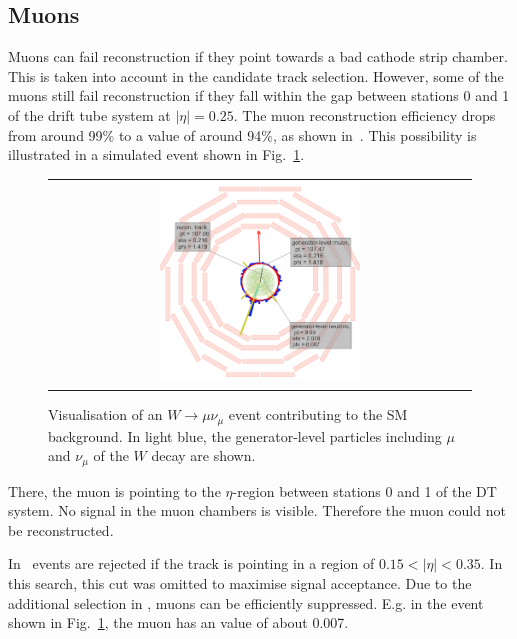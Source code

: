 \subsection*{Muons}
Muons can fail reconstruction if they point towards a bad cathode strip chamber.
This is taken into account in the candidate track selection.
However, some of the muons still fail reconstruction if they fall within the gap between stations 0 and 1 of the drift tube system at $|\eta|=0.25$.
The muon reconstruction efficiency drops from around 99\% to a value of around 94\%, as shown in~\cite{bib:CMS:DT_Thesis,bib:CMS:DT_8TeV_AN}.
This possibility is illustrated in a simulated event shown in Fig.~\ref{fig:LostMuon}.
\begin{figure}[!tb]
  \centering 
  \begin{tabular}{c}
    \includegraphics[width=0.49\textwidth]{figures/analysis/Background/LostMuon_Lumi_456307_event_182377157_NEW.png}
  \end{tabular}
  \caption{Visualisation of an $W\rightarrow \mu\nu_{\mu}$ event contributing to the SM background. 
           In light blue, the generator-level particles including $\mu$ and $\nu_{\mu}$ of the $W$ decay are shown.}
  \label{fig:LostMuon}
\end{figure}
There, the muon is pointing to the $\eta$-region between stations 0 and 1 of the DT system.
No signal in the muon chambers is visible. 
Therefore the muon could not be reconstructed.

In~\cite{bib:CMS:DT_Thesis,bib:CMS:DT_8TeV_AN} events are rejected if the track is pointing in a region of $0.15<|\eta|<0.35$.
In this search, this cut was omitted to maximise signal acceptance. 
Due to the additional selection in \ias, muons can be efficiently suppressed.
E.g. in the event shown in Fig.~\ref{fig:LostMuon}, the muon has an \ias value of about 0.007.\\
\vspace{13pt}

